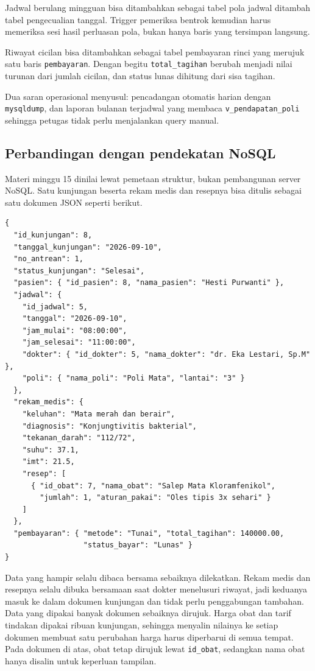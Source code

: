 \documentclass[12pt,a4paper]{article}
\begin{document}
Jadwal berulang mingguan bisa ditambahkan sebagai tabel pola jadwal ditambah
tabel pengecualian tanggal. Trigger pemeriksa bentrok kemudian harus memeriksa
sesi hasil perluasan pola, bukan hanya baris yang tersimpan langsung.

Riwayat cicilan bisa ditambahkan sebagai tabel pembayaran rinci yang merujuk
satu baris \texttt{pembayaran}. Dengan begitu \texttt{total\_tagihan} berubah
menjadi nilai turunan dari jumlah cicilan, dan status lunas dihitung dari sisa
tagihan.

Dua saran operasional menyusul: pencadangan otomatis harian dengan
\texttt{mysqldump}, dan laporan bulanan terjadwal yang membaca
\texttt{v\_pendapatan\_poli} sehingga petugas tidak perlu menjalankan query
manual.

\subsection{Perbandingan dengan pendekatan NoSQL}

Materi minggu 15 dinilai lewat pemetaan struktur, bukan pembangunan server
NoSQL. Satu kunjungan beserta rekam medis dan resepnya bisa ditulis sebagai satu
dokumen JSON seperti berikut.

\begin{lstlisting}[numbers=none]
{
  "id_kunjungan": 8,
  "tanggal_kunjungan": "2026-09-10",
  "no_antrean": 1,
  "status_kunjungan": "Selesai",
  "pasien": { "id_pasien": 8, "nama_pasien": "Hesti Purwanti" },
  "jadwal": {
    "id_jadwal": 5,
    "tanggal": "2026-09-10",
    "jam_mulai": "08:00:00",
    "jam_selesai": "11:00:00",
    "dokter": { "id_dokter": 5, "nama_dokter": "dr. Eka Lestari, Sp.M" },
    "poli": { "nama_poli": "Poli Mata", "lantai": "3" }
  },
  "rekam_medis": {
    "keluhan": "Mata merah dan berair",
    "diagnosis": "Konjungtivitis bakterial",
    "tekanan_darah": "112/72",
    "suhu": 37.1,
    "imt": 21.5,
    "resep": [
      { "id_obat": 7, "nama_obat": "Salep Mata Kloramfenikol",
        "jumlah": 1, "aturan_pakai": "Oles tipis 3x sehari" }
    ]
  },
  "pembayaran": { "metode": "Tunai", "total_tagihan": 140000.00,
                  "status_bayar": "Lunas" }
}
\end{lstlisting}

Data yang hampir selalu dibaca bersama sebaiknya dilekatkan. Rekam medis dan
resepnya selalu dibuka bersamaan saat dokter menelusuri riwayat, jadi keduanya
masuk ke dalam dokumen kunjungan dan tidak perlu penggabungan tambahan. Data
yang dipakai banyak dokumen sebaiknya dirujuk. Harga obat dan tarif tindakan
dipakai ribuan kunjungan, sehingga menyalin nilainya ke setiap dokumen membuat
satu perubahan harga harus diperbarui di semua tempat. Pada dokumen di atas,
obat tetap dirujuk lewat \texttt{id\_obat}, sedangkan nama obat hanya disalin
untuk keperluan tampilan.
\end{document}
